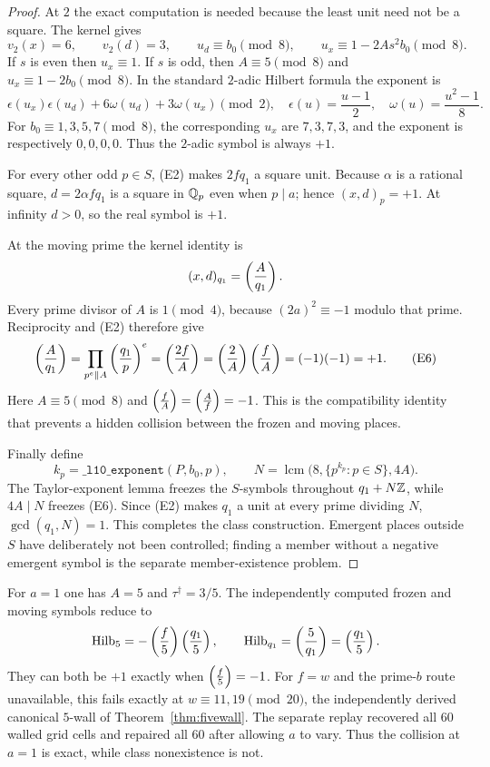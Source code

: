 \begin{proof}
At $2$ the exact computation is needed because the least unit need not be
a square.  The kernel gives
\[
 v_2(x)=6,\qquad v_2(d)=3,\qquad
 u_d\equiv b_0\pmod8,\qquad
 u_x\equiv1-2As^2b_0\pmod8. \tag{E5}
\]
If $s$ is even then $u_x\equiv1$.  If $s$ is odd, then
$A\equiv5\pmod8$ and $u_x\equiv1-2b_0\pmod8$.  In the standard
$2$-adic Hilbert formula the exponent is
\[
 \epsilon(u_x)\epsilon(u_d)+6\omega(u_d)+3\omega(u_x)\pmod2,
 \quad
 \epsilon(u)=\frac{u-1}{2},\quad
 \omega(u)=\frac{u^2-1}{8}.
\]
For $b_0\equiv1,3,5,7\pmod8$, the corresponding $u_x$ are
$7,3,7,3$, and the exponent is respectively $0,0,0,0$.  Thus the
$2$-adic symbol is always $+1$.

For every other odd $p\in S$, (E2) makes $2fq_1$ a square unit.
Because $\alpha$ is a rational square, $d=2\alpha fq_1$ is a square in
$\mathbb{Q}_p$ even when $p\mid a$; hence $(x,d)_p=+1$.  At infinity $d>0$, so
the real symbol is $+1$.

At the moving prime the kernel identity is
\[
 (x,d)_{q_1}=\left(\frac{A}{q_1}\right).
\]
Every prime divisor of $A$ is $1\pmod4$, because
$(2a)^2\equiv-1$ modulo that prime.  Reciprocity and (E2) therefore give
\[
 \left(\frac{A}{q_1}\right)
 =\prod_{p^e\parallel A}\left(\frac{q_1}{p}\right)^{e}
 =\left(\frac{2f}{A}\right)
 =\left(\frac{2}{A}\right)\left(\frac{f}{A}\right)
 =(-1)(-1)=+1. \tag{E6}
\]
Here $A\equiv5\pmod8$ and
$\left(\frac{f}{A}\right)=\left(\frac{A}{f}\right)=-1$.  This is the compatibility identity that
prevents a hidden collision between the frozen and moving places.

Finally define
\[
 k_p=\texttt{\_l10\_exponent}(P,b_0,p),\qquad
 N=\operatorname{lcm}\bigl(8,\{p^{k_p}:p\in S\},4A\bigr).
\]
The Taylor-exponent lemma freezes the $S$-symbols throughout
$q_1+N\mathbb{Z}$, while $4A\mid N$ freezes (E6).  Since (E2) makes $q_1$ a
unit at every prime dividing $N$, $\gcd(q_1,N)=1$.  This completes the
class construction.  Emergent places outside $S$ have deliberately not
been controlled; finding a member without a negative emergent symbol is
the separate member-existence problem.
\end{proof}

\begin{remark}
For $a=1$ one has $A=5$ and $\tau^\dagger=3/5$.  The independently
computed frozen and moving symbols reduce to
\[
 \operatorname{Hilb}_5=-\left(\frac{f}{5}\right)\left(\frac{q_1}{5}\right),
 \qquad
 \operatorname{Hilb}_{q_1}=\left(\frac{5}{q_1}\right)=\left(\frac{q_1}{5}\right).
\]
They can both be $+1$ exactly when $\left(\frac{f}{5}\right)=-1$.  For $f=w$ and the
prime-$b$ route unavailable, this fails exactly at
$w\equiv11,19\pmod{20}$, the independently derived canonical
$5$-wall of Theorem~\ref{thm:fivewall}.  The separate replay recovered
all $60$ walled grid cells and repaired all $60$ after allowing $a$ to
vary.  Thus the collision at $a=1$ is exact, while class nonexistence is
not.
\end{remark}
